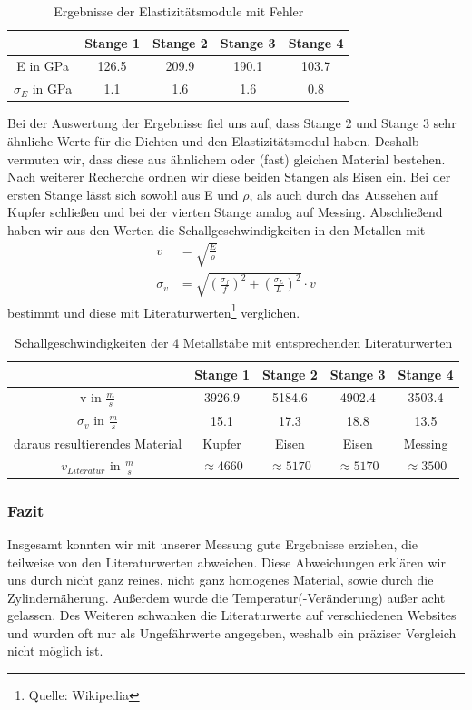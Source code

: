 \documentclass[12pt,a4paper]{article}
\begin{document}
\begin{table}[H]\centering
\caption{Ergebnisse der Elastizitätsmodule mit Fehler}
\begin{tabular}{c|cccc}
 & Stange 1 & Stange 2 & Stange 3 & Stange 4 \\
\hline 
E in GPa & 126.5 & 209.9 & 190.1 & 103.7 \\ 
$\sigma_E$ in GPa & 1.1 & 1.6 & 1.6 & 0.8 \\ 
\end{tabular} 
\end{table}

Bei der Auswertung der Ergebnisse fiel uns auf, dass Stange 2 und Stange 3 sehr ähnliche Werte für die Dichten und den Elastizitätsmodul haben. Deshalb vermuten wir, dass diese aus ähnlichem oder (fast) gleichen Material bestehen. Nach weiterer Recherche ordnen wir diese beiden Stangen als Eisen ein. Bei der ersten Stange lässt sich sowohl aus E und $\rho$, als auch durch das Aussehen auf Kupfer schließen und bei der vierten Stange analog auf Messing.\newline
Abschließend haben wir aus den Werten die Schallgeschwindigkeiten in den Metallen mit
\begin{align}
v&=\sqrt{\frac{E}{\rho}}\\
\sigma_v&=\sqrt{(\frac{\sigma_f}{f})^2+(\frac{\sigma_L}{L})^2}\cdot v
\end{align}
 bestimmt und diese mit Literaturwerten\footnote{Quelle: Wikipedia} verglichen.

\begin{table}[H]\centering
\caption{Schallgeschwindigkeiten der 4 Metallstäbe mit entsprechenden Literaturwerten}
\begin{tabular}{c|cccc}
 & Stange 1 & Stange 2 & Stange 3 & Stange 4 \\ 
\hline
v in $\frac{m}{s}$ & 3926.9 & 5184.6 & 4902.4 & 3503.4 \\ 
$\sigma_{v}$ in $\frac{m}{s}$ & 15.1 & 17.3 & 18.8 & 13.5 \\ 
daraus resultierendes Material & Kupfer & Eisen & Eisen & Messing \\ 
$v_{Literatur}$ in $\frac{m}{s}$ &$\approx 4660$ & $\approx 5170$ & $\approx 5170$ & $\approx 3500$ \\ 
\end{tabular} 
\end{table}

\subsubsection{Fazit}
Insgesamt konnten wir mit unserer Messung gute Ergebnisse erziehen, die teilweise von den Literaturwerten abweichen. Diese Abweichungen erklären wir uns durch nicht ganz reines, nicht ganz homogenes Material, sowie durch die Zylindernäherung. Außerdem wurde die Temperatur(-Veränderung) außer acht gelassen. Des Weiteren schwanken die Literaturwerte auf verschiedenen Websites und wurden oft nur als Ungefährwerte angegeben, weshalb ein präziser Vergleich nicht möglich ist.
\end{document}
